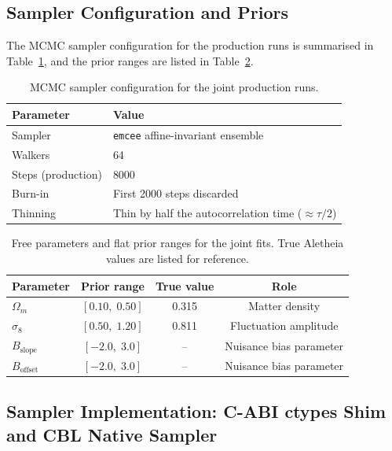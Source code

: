 \documentclass[12pt]{report}
\begin{document}
\subsection{Sampler Configuration and Priors}

The MCMC sampler configuration for the production runs is summarised in Table~\ref{tab:mcmc_config}, and the prior ranges are listed in Table~\ref{tab:priors}.

\begin{table}[H]
    \centering
    \caption{MCMC sampler configuration for the joint production runs.}
    \label{tab:mcmc_config}
    \begin{tabular}{ll}
        \toprule
        \textbf{Parameter} & \textbf{Value} \\
        \midrule
        Sampler           & \texttt{emcee} affine-invariant ensemble \\
        Walkers           & 64 \\
        Steps (production) & 8000 \\
        Burn-in           & First 2000 steps discarded \\
        Thinning          & Thin by half the autocorrelation time ($\approx \tau/2$) \\
        \bottomrule
    \end{tabular}
\end{table}

\begin{table}[H]
    \centering
    \caption{Free parameters and flat prior ranges for the joint fits. True Aletheia values are listed for reference.}
    \label{tab:priors}
    \begin{tabular}{lccc}
        \toprule
        \textbf{Parameter} & \textbf{Prior range} & \textbf{True value} & \textbf{Role} \\
        \midrule
        $\Omega_m$ & $[0.10,\;0.50]$ & 0.315 & Matter density \\
        $\sigma_8$   & $[0.50,\;1.20]$ & 0.811 & Fluctuation amplitude \\
        $B_{\mathrm{slope}}$ & $[-2.0,\;3.0]$ & -- & Nuisance bias parameter \\
        $B_{\mathrm{offset}}$ & $[-2.0,\;3.0]$ & -- & Nuisance bias parameter \\
        \bottomrule
    \end{tabular}
\end{table}

\subsection{Sampler Implementation: C-ABI ctypes Shim and CBL Native Sampler}
\label{sec:sampler_choice_cbl}
\end{document}

